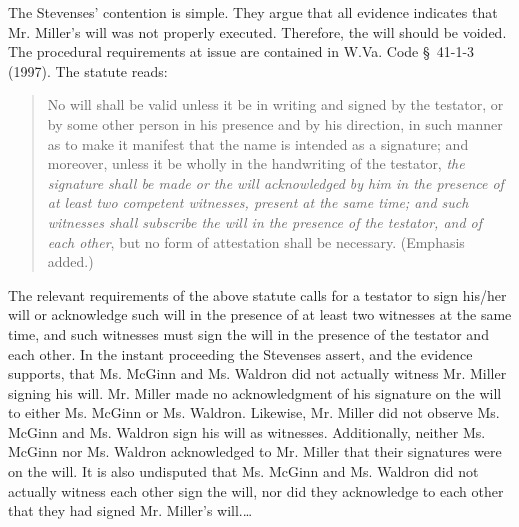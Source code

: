 The Stevenses' contention is simple. They argue that all evidence indicates that
Mr. Miller's will was not properly executed. Therefore, the will should be
voided. The procedural requirements at issue are contained in W.Va. Code
{\S}~41-1-3 (1997). The statute reads: 
\begin{quote}
No will shall be valid unless it be in writing and signed by the testator, or by
some other person in his presence and by his direction, in such manner as to
make it manifest that the name is intended as a signature; and moreover, unless
it be wholly in the handwriting of the testator, \textit{the signature shall be
made or the will acknowledged by him in the presence of at least two competent
witnesses, present at the same time; and such witnesses shall subscribe the
will in the presence of the testator, and of each other}, but no form of
attestation shall be necessary. (Emphasis added.) 
\end{quote}
The relevant requirements of the above statute calls for a testator to sign
his/her will or acknowledge such will in the presence of at least two witnesses
at the same time, and such witnesses must sign the will in the presence of the
testator and each other. In the instant proceeding the Stevenses assert, and
the evidence supports, that Ms. McGinn and Ms. Waldron did not actually witness
Mr. Miller signing his will. Mr. Miller made no acknowledgment of his signature
on the will to either Ms. McGinn or Ms. Waldron. Likewise, Mr. Miller did not
observe Ms. McGinn and Ms. Waldron sign his will as witnesses. Additionally,
neither Ms. McGinn nor Ms. Waldron acknowledged to Mr. Miller that their
signatures were on the will. It is also undisputed that Ms. McGinn and Ms.
Waldron did not actually witness each other sign the will, nor did they
acknowledge to each other that they had signed Mr. Miller's will.\ldots

